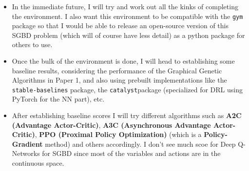 \documentclass[
]{article}
\begin{document}
\begin{itemize}
\item
  In the immediate future, I will try and work out all the kinks of
  completing the environment. I also want this environment to be
  compatible with the \texttt{gym} package so that I would be able to
  release an open-source version of this SGBD problem (which will of
  course have less detail) as a python package for others to use.
\item
  Once the bulk of the environment is done, I will head to establishing
  some baseline results, considering the performance of the Graphical
  Genetic Algorithms in Paper 1, and also using prebuilt implementations
  like the \texttt{stable-baselines} package, the
  \texttt{catalyst}package (specialized for DRL using PyTorch for the NN
  part), etc.
\item
  After establishing baseline scores I will try different algorithms
  such as \textbf{A2C (Advantage Actor-Critic)}, \textbf{A3C
  (Asynchronous Advantage Actor-Critic)}, \textbf{PPO (Proximal Policy
  Optimization)} (which is a \textbf{Policy-Gradient} method) and others
  accordingly. I don't see much scoe for Deep Q-Networks for SGBD since
  most of the variables and actions are in the continuous space.
\end{itemize}
\end{document}
